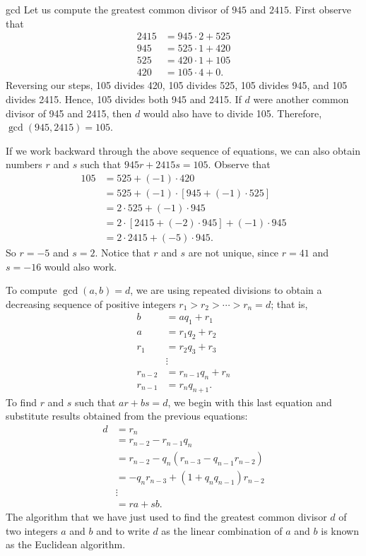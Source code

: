 \begin{example}{gcd}
Let us compute the greatest common divisor of $945$ and $2415$.  First observe that 
\begin{align*}
2415 & = 945 \cdot 2 + 525 \\
945 & = 525 \cdot 1 + 420 \\
525 & = 420 \cdot 1 + 105 \\
420 & = 105 \cdot 4 + 0.
\end{align*}
Reversing our steps, 105 divides 420, 105 divides 525, 105 divides 945, and 105 divides 2415.  Hence, 105 divides both 945 and 2415.  If $d$ were another common divisor of 945 and 2415, then $d$ would also have to divide 105.  Therefore, $\gcd( 945, 2415 ) = 105$.

If we work backward through the above sequence of equations, we can also obtain numbers $r$ and $s$ such that $945 r + 2415 s = 105$.  Observe that 
\begin{align*}
105 & = 525 + (-1) \cdot 420 \\
& = 525 + (-1) \cdot [945 + (-1) \cdot 525] \\
& = 2 \cdot 525 + (-1) \cdot 945 \\
& = 2 \cdot [2415 + (-2) \cdot 945] + (-1) \cdot 945 \\
& = 2 \cdot 2415 + (-5) \cdot 945.
\end{align*}
So $r = -5$ and $s= 2$.  Notice that $r$ and $s$ are not unique, since $r = 41$ and $s = -16$ would also work.
\end{example}

To compute $\gcd(a,b) = d$, we are using repeated divisions to obtain a decreasing sequence of positive integers $r_1 > r_2 > \cdots > r_n = d$; that is,
\begin{align*}
b & = a q_1 + r_1 \\
a & = r_1 q_2 + r_2 \\
r_1 & = r_2 q_3 + r_3 \\
& \vdots  \\
r_{n - 2} & = r_{n - 1} q_{n} + r_{n} \\
r_{n - 1} & = r_n q_{n + 1}.
\end{align*}
To find $r$ and $s$ such that $ar + bs = d$, we begin with this last equation and substitute results obtained from the previous equations:
\begin{align*}
d & = r_n \\
& = r_{n - 2} - r_{n - 1} q_n \\
& = r_{n - 2} - q_n( r_{n - 3} - q_{n - 1} r_{n - 2} ) \\
& = -q_n r_{n - 3} + ( 1+ q_n q_{n-1} ) r_{n - 2}  \\
& \vdots  \\
& = ra + sb.
\end{align*}
The algorithm that we have just used to find the greatest common divisor $d$ of two integers $a$ and $b$ and to write $d$ as the linear combination of $a$ and $b$ is known as the {\bfi Euclidean algorithm}.  
 
